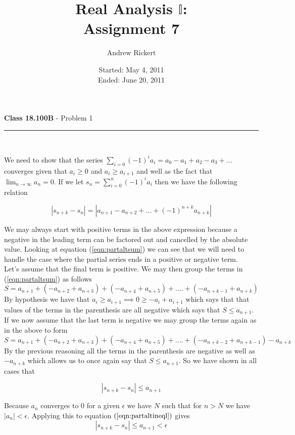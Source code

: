 \documentclass[11pt,reqno]{article}
\title{Real Analysis $\mathbb{I}$: \\ Assignment 7}
\author{Andrew Rickert}
\date{Started: May 4, 2011 \\ \hspace{1pt} Ended: June 20,  2011}                                           %
\begin{document}
\maketitle


\begin{flushleft} 
\textbf{Class 18.100B} - Problem 1\\
\rule{500pt}{1pt}\\
\end{flushleft} 

We need to show that the series $\sum_{i = 0} (-1)^i a_i = a_0 - a_1 + a_2 - a_3 + ... $ converges given that  $a_i \ge 0$ and $ a_i \ge a_{i+1}$ and well as the fact that $\lim_{n \to \infty} a_n = 0$. If we let $s_n = \sum_{i = 0}^n (-1)^i a_i$ then we have the following relation 

\begin{equation} 
|s_{n+k} - s_n| = |a_{n+1} - a_{n+2} + ... + (-1)^{n+k} a_{n+k}| \label{eqn:partaltsum}
\end{equation}

We may always start with positive terms in the above expression because a negative in the leading term can be factored out and cancelled by the absolute value. Looking at equation (\ref{eqn:partaltsum}) we can see that we will need to handle the case where the partial series ends in a positive or negative term. \\
\indent Let's assume that the final term is positive. We may then group the terms in (\ref{eqn:partaltsum}) as follows
\[ S = a_{n+1} + (-a_{n+2} + a_{n+3}) + (-a_{n+4} + a_{n+5}) + .... + (-a_{n+k-1} + a_{n+k}) \]
By hypothesis we have that $a_i \ge a_{i+1} \implies 0 \ge -a_i + a_{i+1} $ which says that that values of the terms in the parenthesis are all negative which says that $S \le a_{n+1}$.\\
If we now assume that the last term is negative we may group the terms again as in the above to form
\[ S = a_{n+1} + (-a_{n+2} + a_{n+3}) + (-a_{n+4} + a_{n+5}) + .... + (-a_{n+k-2} + a_{n+k-1}) - a_{n+k} \]
By the previous reasoning all the terms in the parenthesis are negative as well as $-a_{n+k}$ which allows us to once again say that $S \le a_{n+1}$. So we have shown in all cases that 

\begin{equation}
|s_{n+k} - s_n| \le a_{n+1} \label{eqn:partaltineql}
\end{equation}

Because $a_n$ converges to 0 for a given $\epsilon$ we have $N$ such that for $n > N$ we have $|a_n| < \epsilon$. Applying this to equation $(\ref{eqn:partaltineql})$ gives 
\[ |s_{n+k} - s_n| \le a_{n+1} < \epsilon \]
\end{document}
